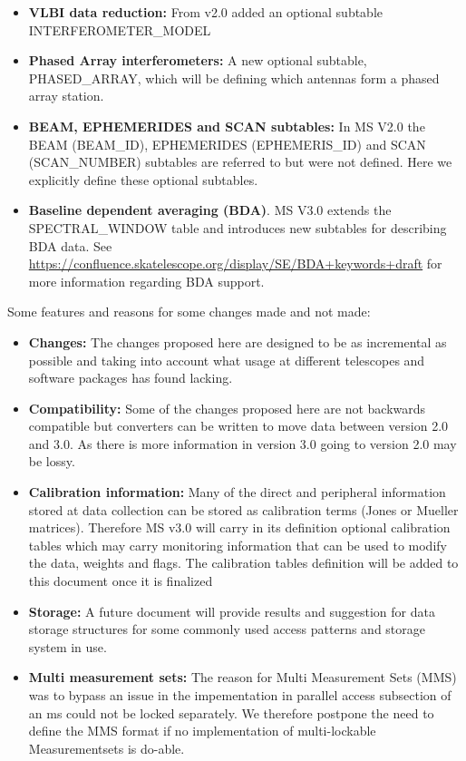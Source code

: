 \documentclass{article}
\begin{document}
\begin{itemize}
\item{{\bf VLBI data reduction:} From v2.0 added an optional subtable
    INTERFEROMETER\_MODEL}

\item{{\bf Phased Array interferometers:} A new optional subtable,
    PHASED\_ARRAY, which will be defining which antennas form a phased
    array station.}

\item{{\bf BEAM, EPHEMERIDES and SCAN subtables:} In MS V2.0 the BEAM
  (BEAM\_ID), EPHEMERIDES (EPHEMERIS\_ID) and SCAN (SCAN\_NUMBER)
  subtables are referred to but were not defined. Here we explicitly
  define these optional subtables.}

\item{{\bf Baseline dependent averaging (BDA)}. MS V3.0 extends the
SPECTRAL\_WINDOW table and introduces new subtables for describing BDA data.
See \url{https://confluence.skatelescope.org/display/SE/BDA+keywords+draft}
for more information regarding BDA support.}

\end{itemize}



Some features and reasons for some changes made and not made:

\begin{itemize}

\item{{\bf Changes:} The changes proposed here are designed
  to be as incremental as possible and taking into account what usage
  at different telescopes and software packages has found lacking.}

\item{{\bf Compatibility:} Some of the changes proposed here are not
  backwards compatible but converters can be written to move data between
  version 2.0 and 3.0. As there is more information in version 3.0
  going to version 2.0 may be lossy.}

\item{{\bf Calibration information:} Many of the direct and peripheral
  information stored at data collection can be stored as calibration
  terms (Jones or Mueller matrices). Therefore MS v3.0 will carry in
  its definition optional calibration tables which may carry
  monitoring information that can be used to modify the data, weights
  and flags. The calibration tables definition will be added to this
  document once it is finalized }

\item{{\bf Storage:} A future document will provide results and
    suggestion for data storage structures for some commonly used
    access patterns and storage system in use.}

\item{{\bf Multi measurement sets:} The reason for Multi Measurement
  Sets (MMS) was to bypass an issue in the impementation in parallel
  access subsection of an ms could not be locked separately. We
  therefore postpone the need to define the MMS format if no
  implementation of multi-lockable Measurementsets is do-able. }


\end{itemize}
\end{document}
